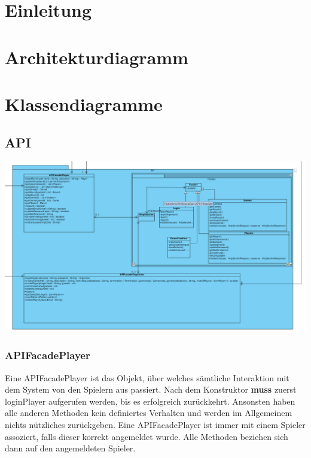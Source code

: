 \documentclass[a4paper]{scrreprt}
\begin{document}
    \tableofcontents
    \chapter{Einleitung}
    \chapter{Architekturdiagramm}

    \chapter{Klassendiagramme}
    \section{API}
    \includegraphics[width=\textwidth]{img/api.png}
    \subsection{APIFacadePlayer}
        Eine APIFacadePlayer ist das Objekt, über welches sämtliche Interaktion mit dem System von den Spielern aus passiert. Nach dem Konstruktor \textbf{muss} zuerst loginPlayer aufgerufen werden, bis es erfolgreich zurückkehrt. Ansonsten haben alle anderen Methoden kein definiertes Verhalten und werden im Allgemeinem nichts nützliches zurückgeben. Eine APIFacadePlayer ist immer mit einem Spieler assoziert, falls dieser korrekt angemeldet wurde. Alle Methoden beziehen sich dann auf den angemeldeten Spieler.
\end{document}
